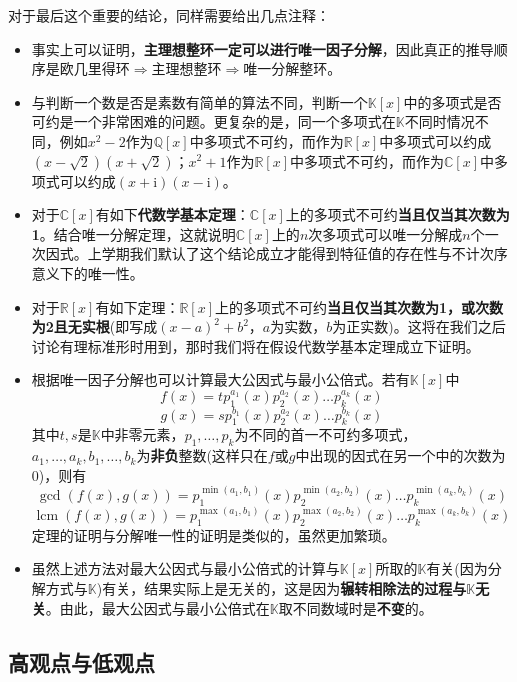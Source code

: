 \documentclass[a4paper,UTF8,fontset=windows,AutoFakeBold]{ctexart}
\DeclareMathOperator{\lcm}{lcm}
\begin{document}
对于最后这个重要的结论，同样需要给出几点注释：
\begin{itemize}
    \item 事实上可以证明，\textbf{主理想整环一定可以进行唯一因子分解}，因此真正的推导顺序是欧几里得环$\Rightarrow$主理想整环$\Rightarrow$唯一分解整环。
    \item 与判断一个数是否是素数有简单的算法不同，判断一个$\mathbb{K}[x]$中的多项式是否可约是一个非常困难的问题。更复杂的是，同一个多项式在$\mathbb{K}$不同时情况不同，例如$x^2-2$作为$\mathbb{Q}[x]$中多项式不可约，而作为$\mathbb{R}[x]$中多项式可以约成$(x-\sqrt2)(x+\sqrt2)$；$x^2+1$作为$\mathbb{R}[x]$中多项式不可约，而作为$\mathbb{C}[x]$中多项式可以约成$(x+\mathrm{i})(x-\mathrm{i})$。
    \item 对于$\mathbb{C}[x]$有如下\textbf{代数学基本定理}：$\mathbb{C}[x]$上的多项式不可约\textbf{当且仅当其次数为1}。结合唯一分解定理，这就说明$\mathbb{C}[x]$上的$n$次多项式可以唯一分解成$n$个一次因式。上学期我们默认了这个结论成立才能得到特征值的存在性与不计次序意义下的唯一性。
    \item 对于$\mathbb{R}[x]$有如下定理：$\mathbb{R}[x]$上的多项式不可约\textbf{当且仅当其次数为1，或次数为2且无实根}(即写成$(x-a)^2+b^2$，$a$为实数，$b$为正实数)。这将在我们之后讨论有理标准形时用到，那时我们将在假设代数学基本定理成立下证明。
    \item 根据唯一因子分解也可以计算最大公因式与最小公倍式。若有$\mathbb{K}[x]$中
    $$f(x)=tp_1^{a_1}(x)p_2^{a_2}(x)\dots p_k^{a_k}(x)$$
    $$g(x)=sp_1^{b_1}(x)p_2^{a_2}(x)\dots p_k^{b_k}(x)$$
    其中$t,s$是$\mathbb{K}$中非零元素，$p_1,\dots,p_k$为不同的首一不可约多项式，$a_1,\dots,a_k,b_1,\dots,b_k$为\textbf{非负}整数(这样只在$f$或$g$中出现的因式在另一个中的次数为0)，则有
    $$\gcd(f(x),g(x))=p_1^{\min(a_1,b_1)}(x)p_2^{\min(a_2,b_2)}(x)\dots p_k^{\min(a_k,b_k)}(x)$$
    $$\lcm(f(x),g(x))=p_1^{\max(a_1,b_1)}(x)p_2^{\max(a_2,b_2)}(x)\dots p_k^{\max(a_k,b_k)}(x)$$
    定理的证明与分解唯一性的证明是类似的，虽然更加繁琐。
    \item 虽然上述方法对最大公因式与最小公倍式的计算与$\mathbb{K}[x]$所取的$\mathbb{K}$有关(因为分解方式与$\mathbb{K}$)有关，结果实际上是无关的，这是因为\textbf{辗转相除法的过程与$\mathbb{K}$无关}。由此，最大公因式与最小公倍式在$\mathbb{K}$取不同数域时是\textbf{不变}的。
\end{itemize}

\subsection{高观点与低观点}
\end{document}
